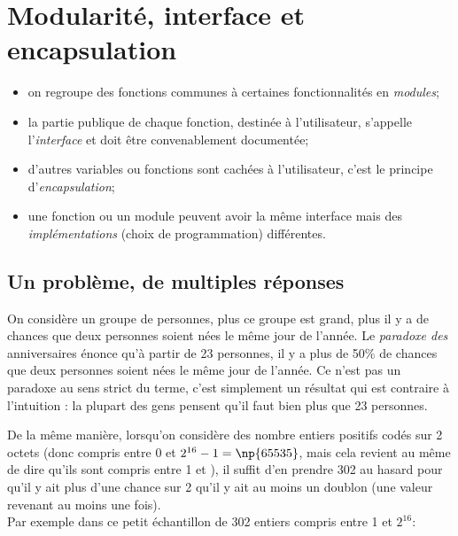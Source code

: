 \documentclass[a4paper,10pt,cours]{nsi}
\begin{document}
\chapter{Modularité, interface et encapsulation}


\begin{aretenir}
    \begin{itemize}
        \item 	on regroupe des fonctions communes à certaines fonctionnalités en \textit{modules};
        \item 	la partie publique de chaque fonction, destinée à l'utilisateur, s'appelle l'\textit{interface}  et doit être convenablement documentée;
        \item 	d'autres variables ou fonctions sont cachées à l'utilisateur, c'est le principe d'\textit{encapsulation};
        \item 	une fonction ou un module peuvent avoir la même interface mais des \textit{implémentations} (choix de programmation) différentes.
              
    \end{itemize}
\end{aretenir}
\section{Un problème, de multiples réponses}
On considère un groupe de personnes, plus ce groupe est grand, plus il y a de chances que deux personnes soient nées le même jour de l'année. Le \textit{paradoxe des} anniversaires énonce qu'à partir de 23 personnes, il y a plus de 50\% de chances que deux personnes soient nées le même jour de l'année. Ce n'est pas un paradoxe au sens strict du terme, c'est simplement un résultat qui est contraire à l'intuition : la plupart des gens pensent qu'il faut bien plus que 23 personnes.

De la même manière, lorsqu'on considère des nombre entiers positifs codés sur 2 octets (donc compris entre 0 et $2^{16}-1=\np{65535}$, mais cela revient au même de dire qu'ils sont compris entre 1 et ), il suffit d'en prendre 302 au hasard pour qu'il y ait plus d'une chance sur 2 qu'il y ait au moins un doublon (une valeur revenant au moins une fois).\\
Par exemple dans ce petit échantillon de 302 entiers compris entre 1 et $2^{16}$:\\
\end{document}
